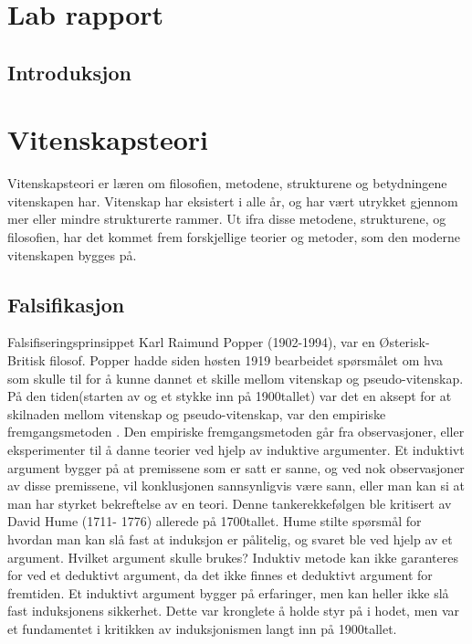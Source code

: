 \documentclass[
]{book}
\begin{document}
\hypertarget{lab-rapport}{%
\chapter{Lab rapport}\label{lab-rapport}}

\hypertarget{introduksjon-1}{%
\section{Introduksjon}\label{introduksjon-1}}

\hypertarget{vitenskapsteori}{%
\chapter{Vitenskapsteori}\label{vitenskapsteori}}

Vitenskapsteori er læren om filosofien, metodene, strukturene og betydningene vitenskapen har. Vitenskap har eksistert i alle år, og har vært utrykket gjennom mer eller mindre strukturerte rammer. Ut ifra disse metodene, strukturene, og filosofien, har det kommet frem forskjellige teorier og metoder, som den moderne vitenskapen bygges på.

\hypertarget{falsifikasjon}{%
\section{Falsifikasjon}\label{falsifikasjon}}

Falsifiseringsprinsippet Karl Raimund Popper (1902-1994), var en Østerisk-Britisk filosof. Popper hadde siden høsten 1919 bearbeidet spørsmålet om hva som skulle til for å kunne dannet et skille mellom vitenskap og pseudo-vitenskap. På den tiden(starten av og et stykke inn på 1900tallet) var det en aksept for at skilnaden mellom vitenskap og pseudo-vitenskap, var den empiriske fremgangsmetoden \citep{popper2002}. Den empiriske fremgangsmetoden går fra observasjoner, eller eksperimenter til å danne teorier ved hjelp av induktive argumenter. Et induktivt argument bygger på at premissene som er satt er sanne, og ved nok observasjoner av disse premissene, vil konklusjonen sannsynligvis være sann, eller man kan si at man har styrket bekreftelse av en teori. Denne tankerekkefølgen ble kritisert av David Hume (1711- 1776) allerede på 1700tallet. Hume stilte spørsmål for hvordan man kan slå fast at induksjon er pålitelig, og svaret ble ved hjelp av et argument. Hvilket argument skulle brukes? Induktiv metode kan ikke garanteres for ved et deduktivt argument, da det ikke finnes et deduktivt argument for fremtiden. Et induktivt argument bygger på erfaringer, men kan heller ikke slå fast induksjonens sikkerhet. Dette var kronglete å holde styr på i hodet, men var et fundamentet i kritikken av induksjonismen langt inn på 1900tallet.
\end{document}
